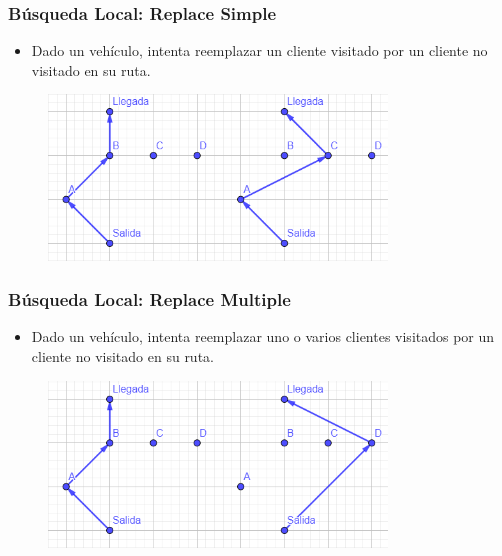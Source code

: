 \documentclass{beamer}
\begin{document}

\begin{frame}
\frametitle{Búsqueda Local: Replace Simple}

\begin{itemize}
    \item Dado un vehículo, intenta reemplazar un cliente visitado por un cliente no visitado en su ruta.
\end{itemize}

\begin{figure}[h]
	\centering
	\includegraphics[width=9cm]{blreplaceSimple}
	\label{fig:blreplaceSimple}
\end{figure}

\end{frame}


\begin{frame}
\frametitle{Búsqueda Local: Replace Multiple}

\begin{itemize}
    \item Dado un vehículo, intenta reemplazar uno o varios clientes visitados por un cliente no visitado en su ruta.
\end{itemize}

\begin{figure}[h]
	\centering
	\includegraphics[width=9cm]{blreplaceMultiple}
	\label{fig:blreplaceMultiple}
\end{figure}

\end{frame}
\end{document}
